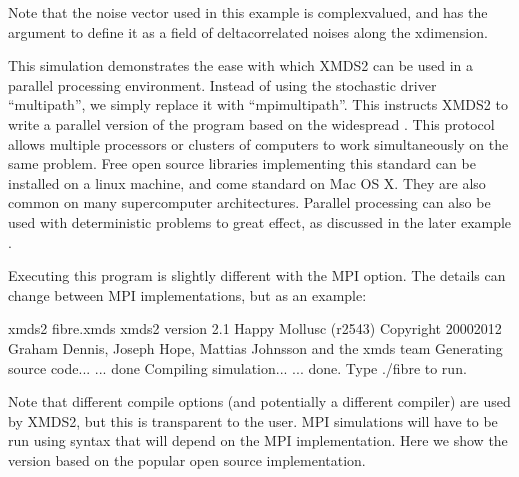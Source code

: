 \documentclass[letterpaper,10pt,english]{sphinxmanual}
\begin{document}
\sphinxAtStartPar
Note that the noise vector used in this example is complex\sphinxhyphen{}valued, and has the argument  to define it as a field of delta\sphinxhyphen{}correlated noises along the x\sphinxhyphen{}dimension.

\ignorespaces 
{}\ignorespaces 
\sphinxAtStartPar
This simulation demonstrates the ease with which XMDS2 can be used in a parallel processing environment.  Instead of using the stochastic driver “multi\sphinxhyphen{}path”, we simply replace it with “mpi\sphinxhyphen{}multi\sphinxhyphen{}path”.  This instructs XMDS2 to write a parallel version of the program based on the widespread .  This protocol allows multiple processors or clusters of computers to work simultaneously on the same problem.  Free open source libraries implementing this standard can be installed on a linux machine, and come standard on Mac OS X.  They are also common on many supercomputer architectures.  Parallel processing can also be used with deterministic problems to great effect, as discussed in the later example {\hyperref[\detokenize{worked_examples:wignerarguments}]{}}.

\sphinxAtStartPar
Executing this program is slightly different with the MPI option.  The details can change between MPI implementations, but as an example:

\begin{sphinxVerbatim}[commandchars=\\\{\}]
\PYGZdl{}xmds2 fibre.xmds
xmds2 version 2.1 \PYGZdq{}Happy Mollusc\PYGZdq{} (r2543)
Copyright 2000\PYGZhy{}2012 Graham Dennis, Joseph Hope, Mattias Johnsson
                    and the xmds team
Generating source code...
... done
Compiling simulation...
... done. Type \PYGZsq{}./fibre\PYGZsq{} to run.
\end{sphinxVerbatim}

\sphinxAtStartPar
Note that different compile options (and potentially a different compiler) are used by XMDS2, but this is transparent to the user.  MPI simulations will have to be run using syntax that will depend on the MPI implementation.  Here we show the version based on the popular open source  implementation.
\end{document}
